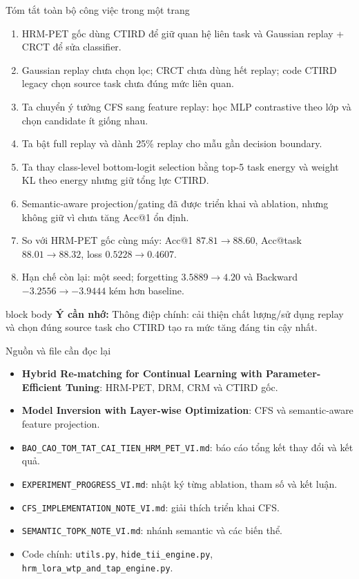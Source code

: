 \documentclass[aspectratio=169,11pt]{beamer}
\newcommand{\remember}[1]{%
  \vfill
  \begin{beamercolorbox}[wd=\textwidth,sep=0.22cm,rounded=true]{block body}
    \textbf{Ý cần nhớ:} #1
  \end{beamercolorbox}
}
\begin{document}
\begin{frame}{Tóm tắt toàn bộ công việc trong một trang}
  \small
  \begin{enumerate}\setlength\itemsep{0.22cm}
    \item HRM-PET gốc dùng CTIRD để giữ quan hệ liên task và Gaussian replay + CRCT để sửa classifier.
    \item Gaussian replay chưa chọn lọc; CRCT chưa dùng hết replay; code CTIRD legacy chọn source task chưa đúng mức liên quan.
    \item Ta chuyển ý tưởng CFS sang feature replay: học MLP contrastive theo lớp và chọn candidate ít giống nhau.
    \item Ta bật full replay và dành 25\% replay cho mẫu gần decision boundary.
    \item Ta thay class-level bottom-logit selection bằng top-5 task energy và weight KL theo energy nhưng giữ tổng lực CTIRD.
    \item Semantic-aware projection/gating đã được triển khai và ablation, nhưng không giữ vì chưa tăng Acc@1 ổn định.
    \item So với HRM-PET gốc cùng máy: Acc@1 $87.81\rightarrow88.60$, Acc@task $88.01\rightarrow88.32$, loss $0.5228\rightarrow0.4607$.
    \item Hạn chế còn lại: một seed; forgetting $3.5889\rightarrow4.20$ và Backward $-3.2556\rightarrow-3.9444$ kém hơn baseline.
  \end{enumerate}
  \remember{Thông điệp chính: cải thiện chất lượng/sử dụng replay và chọn đúng source task cho CTIRD tạo ra mức tăng đáng tin cậy nhất.}
\end{frame}

\appendix
\begin{frame}{Nguồn và file cần đọc lại}
  \small
  \begin{itemize}\setlength\itemsep{0.28cm}
    \item \textbf{Hybrid Re-matching for Continual Learning with Parameter-Efficient Tuning}: HRM-PET, DRM, CRM và CTIRD gốc.
    \item \textbf{Model Inversion with Layer-wise Optimization}: CFS và semantic-aware feature projection.
    \item \texttt{BAO\_CAO\_TOM\_TAT\_CAI\_TIEN\_HRM\_PET\_VI.md}: báo cáo tổng kết thay đổi và kết quả.
    \item \texttt{EXPERIMENT\_PROGRESS\_VI.md}: nhật ký từng ablation, tham số và kết luận.
    \item \texttt{CFS\_IMPLEMENTATION\_NOTE\_VI.md}: giải thích triển khai CFS.
    \item \texttt{SEMANTIC\_TOPK\_NOTE\_VI.md}: nhánh semantic và các biến thể.
    \item Code chính: \texttt{utils.py}, \texttt{hide\_tii\_engine.py}, \texttt{hrm\_lora\_wtp\_and\_tap\_engine.py}.
  \end{itemize}
\end{frame}
\end{document}
